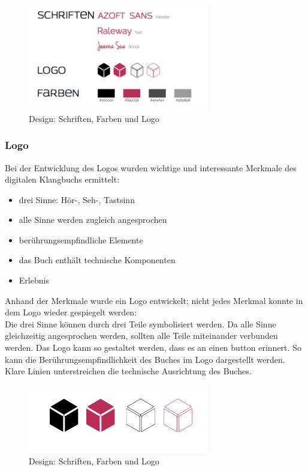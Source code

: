 \begin{figure}[H]
\centering
\includegraphics[width=0.7\textwidth]{grafiken/corporatedesign1.png}
\caption{Design: Schriften, Farben und Logo}
\label{fig:design}
\end{figure}

\subsubsection{Logo}
Bei der Entwicklung des Logos wurden wichtige und interessante Merkmale des digitalen Klangbuchs ermittelt:
\begin{itemize}
\item drei Sinne: Hör-, Seh-, Tastsinn
\item alle Sinne werden zugleich angesprochen
\item berührungsempfindliche Elemente
\item das Buch enthält technische Komponenten
\item Erlebnis
\end{itemize}

Anhand der Merkmale wurde ein Logo entwickelt; nicht jedes Merkmal konnte in dem Logo wieder gespiegelt werden:\\
Die drei Sinne können durch drei Teile symbolisiert werden. Da alle Sinne gleichzeitig angesprochen werden, sollten alle Teile miteinander verbunden werden. Das Logo kann so gestaltet werden, dass es an einen \gls{button} erinnert. So kann die Berührungsempfindlichkeit des Buches im Logo dargestellt werden. Klare Linien unterstreichen die technische Ausrichtung des Buches.

\begin{figure}[H]
\centering
\includegraphics[width=0.7\textwidth]{grafiken/logo.png}
\caption{Design: Schriften, Farben und Logo}
\label{fig:logo}
\end{figure}

